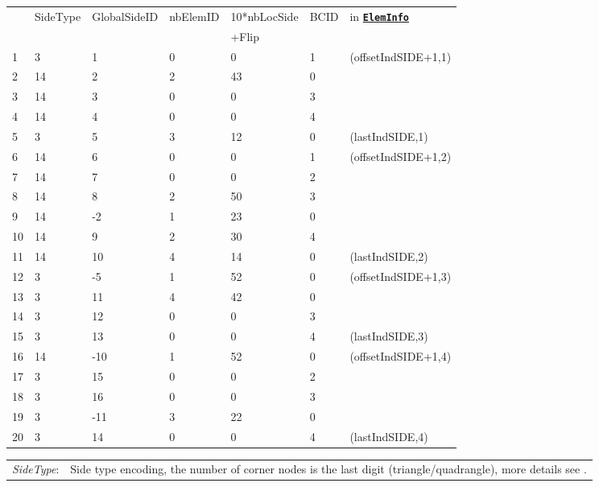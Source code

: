 \documentclass[a4paper,headsepline]{scrreprt}
\newcommand\rf[1]{\prettyref{#1}}
\newcommand\ttbf[1]{\textbf{\texttt{#1}}}
\newcommand\ElemInfo{\hyperlink{ElemInfo}{\ttbf{ElemInfo}}}
\newcommand\nSides{\ttbf{nSides}}
\begin{document}
\begin{table}[h!]
\centering
\begin{tabular}{|l|l|l|l|l|l||l|}
\hline
  & SideType & GlobalSideID & nbElemID & 10*nbLocSide   & BCID  & in \ElemInfo \\ 
  &          &        &          &  +Flip   &       &              \\\hline\hline
1  &  3 &  1 & 0 &  0 & 1 &  (offsetIndSIDE+1,1) \\ 
2  & 14 &  2 & 2 & 43 & 0 &  \\ 
3  & 14 &  3 & 0 &  0 & 3 &  \\ 
4  & 14 &  4 & 0 &  0 & 4 &  \\ 
5  &  3 &  5 & 3 & 12 & 0 &  (lastIndSIDE,1) \\ \hline 
6  & 14 &  6 & 0 &  0 & 1 &  (offsetIndSIDE+1,2) \\ 
7  & 14 &  7 & 0 &  0 & 2 &  \\ 
8  & 14 &  8 & 2 & 50 & 3 &  \\ 
9  & 14 & -2 & 1 & 23 & 0 &  \\ 
10 & 14 &  9 & 2 & 30 & 4 &  \\ 
11 & 14 & 10 & 4 & 14 & 0 &  (lastIndSIDE,2) \\ \hline
12 &  3 & -5 & 1 & 52 & 0 &  (offsetIndSIDE+1,3) \\ 
13 &  3 & 11 & 4 & 42 & 0 &  \\ 
14 &  3 & 12 & 0 &  0 & 3 &  \\ 
15 &  3 & 13 & 0 &  0 & 4 &  (lastIndSIDE,3) \\ \hline%
16 & 14 &-10 & 1 & 52 & 0 &  (offsetIndSIDE+1,4) \\ 
17 &  3 & 15 & 0 &  0 & 2 &  \\ 
18 &  3 & 16 & 0 &  0 & 3 &  \\ 
19 &  3 &-11 & 3 & 22 & 0 &  \\ 
20 &  3 & 14 & 0 &  0 & 4 &  (lastIndSIDE,4) \\ \hline%
\end{tabular}\vspace{2ex}
\begin{tabularx}{1.0\textwidth}{|lX|}\hline
\emph{SideType}:        & Side type encoding, the number of corner nodes is the last digit (triangle/quadrangle), more details see \rf{sec:elemtypes}. \\

\end{tabularx}
\end{table}
\end{document}
